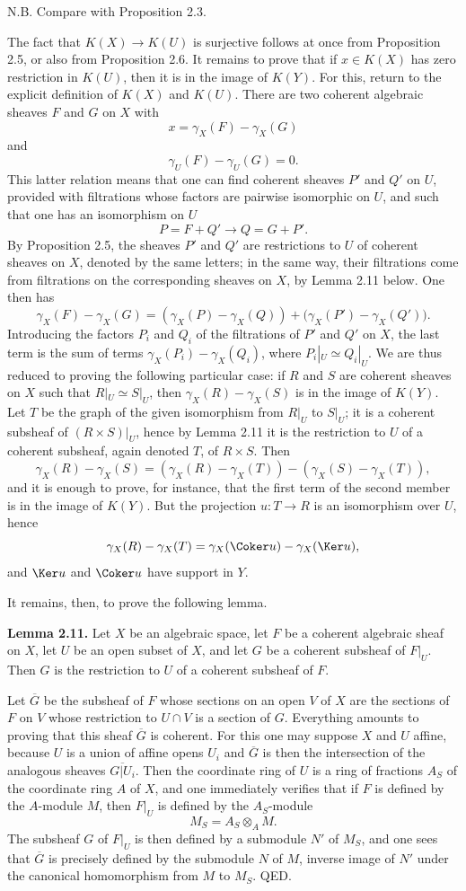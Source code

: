 N.B. Compare with Proposition 2.3.

The fact that $K(X)\to K(U)$ is surjective follows at once from Proposition 2.5, or also from Proposition 2.6. It remains to prove that if $x\in K(X)$ has zero restriction in $K(U)$, then it is in the image of $K(Y)$. For this, return to the explicit definition of $K(X)$ and $K(U)$. There are two coherent algebraic sheaves $F$ and $G$ on $X$ with
\[
 x=\gamma_X(F)-\gamma_X(G)
\]
and
\[
 \gamma_U(F)-\gamma_U(G)=0.
\]
This latter relation means that one can find coherent sheaves $P'$ and $Q'$ on $U$, provided with filtrations whose factors are pairwise isomorphic on $U$, and such that one has an isomorphism on $U$
\[
 P=F+Q'\longrightarrow Q=G+P'.
\]
By Proposition 2.5, the sheaves $P'$ and $Q'$ are restrictions to $U$ of coherent sheaves on $X$, denoted by the same letters; in the same way, their filtrations come from filtrations on the corresponding sheaves on $X$, by Lemma 2.11 below. One then has
\[
 \gamma_X(F)-\gamma_X(G)=(\gamma_X(P)-\gamma_X(Q))+\bigl(\gamma_X(P')-\gamma_X(Q')\bigr).
\]
Introducing the factors $P_i$ and $Q_i$ of the filtrations of $P'$ and $Q'$ on $X$, the last term is the sum of terms $\gamma_X(P_i)-\gamma_X(Q_i)$, where $P_i|_U\simeq Q_i|_U$. We are thus reduced to proving the following particular case: if $R$ and $S$ are coherent sheaves on $X$ such that $R|_U\simeq S|_U$, then $\gamma_X(R)-\gamma_X(S)$ is in the image of $K(Y)$. Let $T$ be the graph of the given isomorphism from $R|_U$ to $S|_U$; it is a coherent subsheaf of $(R\times S)|_U$, hence by Lemma 2.11 it is the restriction to $U$ of a coherent subsheaf, again denoted $T$, of $R\times S$. Then
\[
 \gamma_X(R)-\gamma_X(S)=(\gamma_X(R)-\gamma_X(T))-(\gamma_X(S)-\gamma_X(T)),
\]
and it is enough to prove, for instance, that the first term of the second member is in the image of $K(Y)$. But the projection $u:T\to R$ is an isomorphism over $U$, hence
\[
 \gamma_X(R)-\gamma_X(T)=\gamma_X(\Coker u)-\gamma_X(\Ker u),
\]
and $\Ker u$ and $\Coker u$ have support in $Y$.

It remains, then, to prove the following lemma.

\textbf{Lemma 2.11.} Let $X$ be an algebraic space, let $F$ be a coherent algebraic sheaf on $X$, let $U$ be an open subset of $X$, and let $G$ be a coherent subsheaf of $F|_U$. Then $G$ is the restriction to $U$ of a coherent subsheaf of $F$.

Let $\overline G$ be the subsheaf of $F$ whose sections on an open $V$ of $X$ are the sections of $F$ on $V$ whose restriction to $U\cap V$ is a section of $G$. Everything amounts to proving that this sheaf $\overline G$ is coherent. For this one may suppose $X$ and $U$ affine, because $U$ is a union of affine opens $U_i$ and $\overline G$ is then the intersection of the analogous sheaves $\overline{G|U_i}$. Then the coordinate ring of $U$ is a ring of fractions $A_S$ of the coordinate ring $A$ of $X$, and one immediately verifies that if $F$ is defined by the $A$-module $M$, then $F|_U$ is defined by the $A_S$-module
\[
 M_S=A_S\otimes_A M.
\]
The subsheaf $G$ of $F|_U$ is then defined by a submodule $N'$ of $M_S$, and one sees that $\overline G$ is precisely defined by the submodule $N$ of $M$, inverse image of $N'$ under the canonical homomorphism from $M$ to $M_S$. QED.

